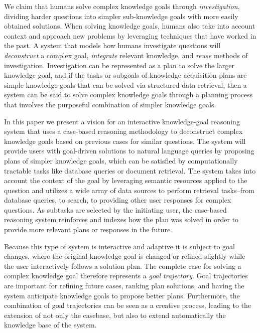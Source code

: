 \documentclass[11pt,letterpaper]{article}
\begin{document}
We claim that humans solve complex knowledge goals through \textit{investigation}, dividing harder questions into simpler sub-knowledge goals with more easily obtained solutions. When solving knowledge goals, humans also take into account context and approach new problems by leveraging techniques that have worked in the past. A system that models how humans investigate questions will \textit{deconstruct} a complex goal, \textit{integrate} relevant knowledge, and \textit{reuse} methods of investigation. Investigation can be represented as a plan to solve the larger knowledge goal, and if the tasks or subgoals of knowledge acquisition plans are simple knowledge goals that can be solved via structured data retrieval, then a system can be said to solve complex knowledge goals through a planning process that involves the purposeful combination of simpler knowledge goals.

In this paper we present a vision for an interactive knowledge-goal reasoning system that uses a case-based reasoning methodology to deconstruct complex knowledge goals based on previous cases for similar questions. The system will provide users with goal-driven solutions to natural language queries by proposing plans of simpler knowledge goals, which can be satisfied by computationally tractable tasks like database queries or document retrieval. The system takes into account the context of the goal by leveraging semantic resources applied to the question and utilizes a wide array of data sources to perform retrieval tasks--from database queries, to search, to providing other user responses for complex questions. As subtasks are selected by the initiating user, the case-based reasoning system reinforces and indexes how the plan was solved in order to provide more relevant plans or responses in the future.

Because this type of system is interactive and adaptive it is subject to goal changes, where the original knowledge goal is changed or refined slightly while the user interactively follows a solution plan. The complete case for solving a complex knowledge goal therefore represents a \textit{goal trajectory}. Goal trajectories are important for refining future cases, ranking plan solutions, and having the system anticipate knowledge goals to propose better plans. Furthermore, the combination of goal trajectories can be seen as a creative process, leading to the extension of not only the casebase, but also to extend automatically the knowledge base of the system.

\end{document}
